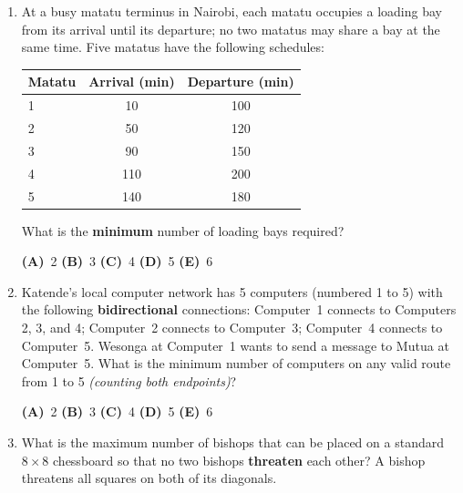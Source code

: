 \documentclass[a4paper,12pt]{article}
\newcommand{\hchoices}[5]{%
  \par\vspace{5pt}%
  \noindent\hspace{2em}%
  \textbf{(A)}~#1\hfill%
  \textbf{(B)}~#2\hfill%
  \textbf{(C)}~#3\hfill%
  \textbf{(D)}~#4\hfill%
  \textbf{(E)}~#5\par%
  \vspace{4pt}%
}
\newenvironment{choices}{%
  \begin{enumerate}[label=\textbf{(\Alph*)},
                    leftmargin=2.5em,
                    itemsep=2pt,
                    topsep=4pt,
                    parsep=0pt]%
}{%
  \end{enumerate}%
}
\begin{document}
\begin{enumerate}[label=\textbf{Q\arabic*.},
                  itemsep=3.5ex,
                  leftmargin=3.8em,
                  parsep=0pt]
\begin{choices}
  \item Vertices $\{1,2,3,4,5\}$;\quad
        edges $(1,2),(2,3),(3,4),(4,5),(5,1)$.
  \item Vertices $\{1,2,3,4\}$;\quad
        edges $(1,2),(1,3),(1,4),(2,3),(2,4),(3,4)$.
  \item Vertices $\{1,2,3,4,5\}$;\quad
        edges $(1,2),(2,3),(3,4),(4,1),(1,5),(5,3)$.
  \item Vertices $\{1,2,3,4\}$;\quad
        edges $(1,2),(2,3),(3,4),(4,1),(1,3)$.
  \item Vertices $\{1,2,3,4,5\}$;\quad
        edges $(1,2),(2,3),(3,4),(4,5)$.
\end{choices}

\item At a busy matatu terminus in Nairobi, each matatu occupies a loading bay
from its arrival until its departure; no two matatus may share a bay at the
same time. Five matatus have the following schedules:

\medskip
\begin{center}
\begin{tabular}{lcc}
  \toprule
  Matatu & Arrival (min) & Departure (min) \\
  \midrule
  1 & 10  & 100 \\
  2 & 50  & 120 \\
  3 & 90  & 150 \\
  4 & 110 & 200 \\
  5 & 140 & 180 \\
  \bottomrule
\end{tabular}
\end{center}
\medskip

What is the \textbf{minimum} number of loading bays required?

\hchoices{2}{3}{4}{5}{6}

\item Katende's local computer network has 5 computers (numbered 1 to 5)
with the following \textbf{bidirectional} connections:
Computer~1 connects to Computers 2, 3, and 4;
Computer~2 connects to Computer~3;
Computer~4 connects to Computer~5.
Wesonga at Computer~1 wants to send a message to Mutua at Computer~5.
What is the minimum number of computers on any valid route from 1 to 5
\emph{(counting both endpoints)}?

\hchoices{2}{3}{4}{5}{6}

\item What is the maximum number of bishops that can be placed on a standard
$8{\times}8$ chessboard so that no two bishops \textbf{threaten} each other?
A bishop threatens all squares on both of its diagonals.


\end{enumerate}
\end{document}
